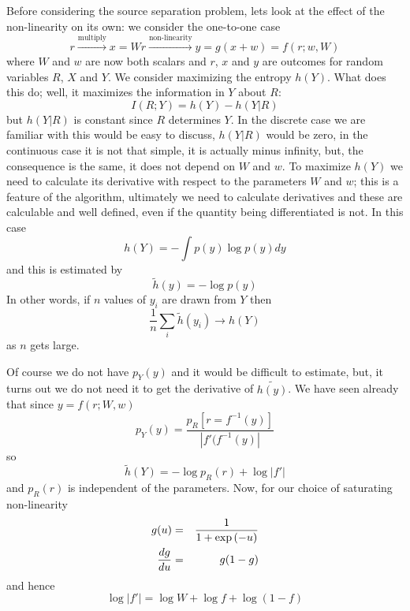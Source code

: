 \documentclass[12pt]{article}
\begin{document}
Before considering the source separation problem, lets look at the
effect of the non-linearity on its own: we consider the one-to-one
case
\begin{equation}
r\stackrel{\mbox{multiply}}{\longrightarrow}x=Wr\stackrel{\mbox{non-linearity}}{\longrightarrow}y=g(x+w)=f(r;w,W)
\end{equation}
where $W$ and $w$ are now both scalars and $r$, $x$ and $y$ are
outcomes for random variables $R$, $X$ and $Y$. We consider maximizing
the entropy $h(Y)$. What does this do; well, it maximizes the
information in $Y$ about $R$:
\begin{equation}
I(R;Y)=h(Y)-h(Y|R)
\end{equation}
but $h(Y|R)$ is constant since $R$ determines $Y$. In the discrete
case we are familiar with this would be easy to discuss, $h(Y|R)$
would be zero, in the continuous case it is not that simple, it is
actually minus infinity, but, the consequence is the same, it does not
depend on $W$ and $w$. To maximize $h(Y)$ we need to calculate its
derivative with respect to the parameters $W$ and $w$; this is a
feature of the algorithm, ultimately we need to calculate derivatives
and these are calculable and well defined, even if the quantity being
differentiated is not. In this case
\begin{equation}
h(Y)=-\int p(y)\log{p(y)} dy
\end{equation}
and this is estimated by
\begin{equation}
\tilde{h}(y)=-\log{p(y)}
\end{equation}
In other words, if $n$ values of $y_i$ are drawn from $Y$ then 
\begin{equation}
\frac{1}{n}\sum_i\tilde{h}(y_i)\rightarrow h(Y)
\end{equation}
as $n$ gets large. 

Of course we do not have $p_Y(y)$ and it would be difficult to
estimate, but, it turns out we do not need it to get the derivative of
$\tilde{h(y)}$. We have seen already that since $y=f(r;W,w)$
\begin{equation}
p_Y(y)=\frac{p_R[r=f^{-1}(y)]}{|f'(f^{-1}(y)|}
\end{equation}
so
\begin{equation}
\tilde{h}(Y)=-\log{p_R(r)}+\log{|f'|}
\end{equation}
and $p_R(r)$ is independent of the parameters. Now, for our choice of saturating non-linearity
\begin{eqnarray}
g(u)&=&\frac{1}{1+\exp{(-u)}}\cr
\frac{dg}{du}&=&g(1-g)
\end{eqnarray}
and hence
\begin{equation}
\log{|f'|}=\log{W}+\log{f}+\log{(1-f)}
\end{equation}
\end{document}
